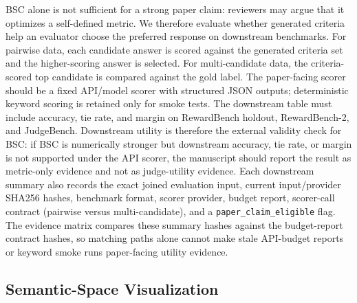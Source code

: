 BSC alone is not sufficient for a strong paper claim: reviewers may argue that
it optimizes a self-defined metric. We therefore evaluate whether generated
criteria help an evaluator choose the preferred response on downstream
benchmarks. For pairwise data, each candidate answer is scored against the
generated criteria set and the higher-scoring answer is selected. For
multi-candidate data, the criteria-scored top candidate is compared against the
gold label. The paper-facing scorer should be a fixed API/model scorer with
structured JSON outputs; deterministic keyword scoring is retained only for
smoke tests. The downstream table must include accuracy, tie rate, and margin
on RewardBench holdout, RewardBench-2, and JudgeBench.
Downstream utility is therefore the external validity check for BSC: if BSC
is numerically stronger but downstream accuracy, tie rate, or margin is not
supported under the API scorer, the manuscript should report the result as
metric-only evidence and not as judge-utility evidence.
Each downstream summary also records the exact joined evaluation input,
current input/provider SHA256 hashes, benchmark format, scorer provider,
budget report, scorer-call contract (pairwise versus multi-candidate), and a
\texttt{paper\_claim\_eligible} flag. The evidence matrix compares these
summary hashes against the budget-report contract hashes, so matching paths
alone cannot make stale API-budget reports or keyword smoke runs paper-facing
utility evidence.


\subsection{Semantic-Space Visualization}

